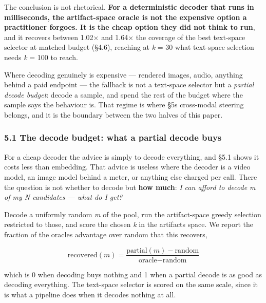\documentclass[
  10pt,
]{article}
\theoremstyle{plain}
\theoremstyle{definition}
\begin{document}
The conclusion is not rhetorical. \textbf{For a deterministic decoder
that runs in milliseconds, the artifact-space oracle is not the
expensive option a practitioner forgoes. It is the cheap option they did
not think to run}, and it recovers between 1.02× and 1.64× the coverage
of the best text-space selector at matched budget (§4.6), reaching at
\emph{k} = 30 what text-space selection needs \emph{k} = 100 to reach.

Where decoding genuinely is expensive --- rendered images, audio,
anything behind a paid endpoint --- the fallback is not a text-space
selector but a \emph{partial decode budget}: decode a sample, and spend
the rest of the budget where the sample says the behaviour is. That
regime is where §5\textquotesingle s cross-modal steering belongs, and
it is the boundary between the two halves of this paper.

\subsubsection{5.1 The decode budget: what a partial decode
buys}\label{51-the-decode-budget-what-a-partial-decode-buys}

For a cheap decoder the advice is simply to decode everything, and §5.1
shows it costs less than embedding. That advice is useless where the
decoder is a video model, an image model behind a meter, or anything
else charged per call. There the question is not whether to decode but
\textbf{how much}: \emph{I can afford to decode m of my N candidates ---
what do I get?}

Decode a uniformly random \emph{m} of the pool, run the artifact-space
greedy selection restricted to those, and score the chosen \emph{k} in
the artifact\textquotesingle s space. We report the fraction of the
oracle\textquotesingle s advantage over random that this recovers,

\[\text{recovered}(m) = \frac{\text{partial}(m) - \text{random}}{\text{oracle} - \text{random}}\]

which is 0 when decoding buys nothing and 1 when a partial decode is as
good as decoding everything. The text-space selector is scored on the
same scale, since it is what a pipeline does when it decodes nothing at
all.
\end{document}
